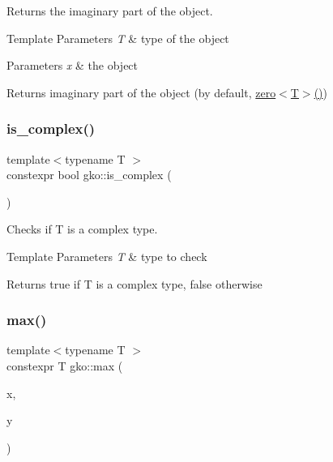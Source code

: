 Returns the imaginary part of the object. 


\begin{DoxyTemplParams}{Template Parameters}
{\em T} & type of the object\\
\hline
\end{DoxyTemplParams}

\begin{DoxyParams}{Parameters}
{\em x} & the object\\
\hline
\end{DoxyParams}
\begin{DoxyReturn}{Returns}
imaginary part of the object (by default, \hyperlink{namespacegko_a70dbe01ff95c7b953d3d737424c6feb5}{zero$<$\+T$>$()}) 
\end{DoxyReturn}
\mbox{\label{namespacegko_a9b3e79911bb6145d7ba865dbe436b915}} 
\subsubsection{\texorpdfstring{is\+\_\+complex()}{is\_complex()}}
{\footnotesize\ttfamily template$<$typename T $>$ \\
constexpr bool gko\+::is\+\_\+complex (\begin{DoxyParamCaption}{ }\end{DoxyParamCaption})\hspace{0.3cm}{\ttfamily [inline]}}



Checks if T is a complex type. 


\begin{DoxyTemplParams}{Template Parameters}
{\em T} & type to check\\
\hline
\end{DoxyTemplParams}
\begin{DoxyReturn}{Returns}
{\ttfamily true} if T is a complex type, {\ttfamily false} otherwise 
\end{DoxyReturn}
\mbox{\label{namespacegko_af1812df45c6ec07780d579a12b64c753}} 
\subsubsection{\texorpdfstring{max()}{max()}}
{\footnotesize\ttfamily template$<$typename T $>$ \\
constexpr T gko\+::max (\begin{DoxyParamCaption}\item[{const T \&}]{x,  }\item[{const T \&}]{y }\end{DoxyParamCaption})\hspace{0.3cm}{\ttfamily [inline]}}



